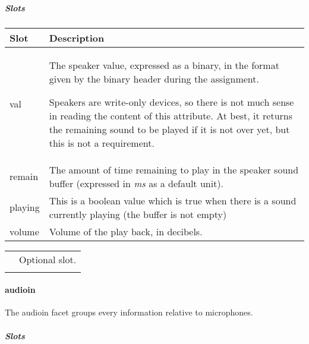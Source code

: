 \documentclass[a4paper]{article}
\begin{document}
\subparagraph{Slots}

\begin{flushleft}
\tablehead{}
\begin{supertabular}{|m{3.293cm}|m{11.997cm}|}
\hline
\sffamily\bfseries Slot &
\sffamily\bfseries Description\\\hline
val &
 The speaker value, expressed as a
binary, in the format given by the binary header during the
assignment.

\sffamily Speakers are write-only devices, so
there is not much sense in reading the content of this attribute. At
best, it returns the remaining sound to be played if it is not over
yet, but this is not a requirement.\\\hline
remain &
\textsf{The amount of time remaining to play in
the speaker sound buffer (expressed in }\textsf{\textit{ms}}\textsf{ as
a default unit).}\\\hline
playing &
\sffamily This is a boolean value which is true
when there is a sound currently playing (the buffer is not
empty)\\\hline
volume &
\sffamily Volume of the play back, in
decibels.\\\hline
\end{supertabular}
\end{flushleft}
\begin{flushleft}
\tablehead{}
\begin{supertabular}{|m{1.717cm}|m{10.464cm}}
\hhline{-~}
 &
Optional slot.\\\hhline{-~}
\end{supertabular}
\end{flushleft}
\paragraph{audioin}


The audioin facet groups every information relative to microphones.

\subparagraph{Slots}
\end{document}
